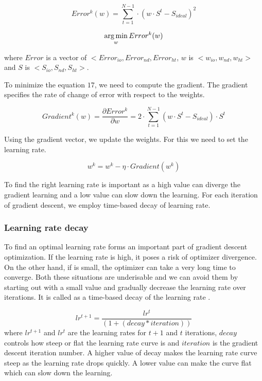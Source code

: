 \begin{equation}
Error^k(w) = \sum_{t=1}^{N-1} \cdot (w \cdot S^t - S_{ideal}) ^ 2
\end{equation}

\begin{equation}
\operatorname*{arg\,min}_w Error^k(w) 
\end{equation} 

where $Error$ is a vector of $<Error_{io}, Error_{nd}, Error_{ht}$,
$w$ is $<w_{io}, w_{nd}, w_{ht}>$ and $S$ is $<S_{io}, S_{nd}, S_{ht}>$.

To minimize the equation $17$, we need to compute the gradient. The gradient specifies the rate of change of error with respect to the weights.

\begin{equation}
Gradient^k(w) = \frac{\partial Error^k}{\partial w} = 2 \cdot \sum_{t=1}^{N-1} (w \cdot S^t - S_{ideal}) \cdot S^t
\end{equation}

Using the gradient vector, we update the weights. For this we need to set the learning rate.

\begin{equation}
w^k = w^k - \eta \cdot {Gradient(w^k)}
\end{equation}

To find the right learning rate is important as a high value can diverge the gradient learning and a low value can slow down the learning. For each iteration of gradient descent, we employ time-based decay of learning rate.


\subsubsection{Learning rate decay}
To find an optimal learning rate forms an important part of gradient descent optimization. If the learning rate is high, it poses a risk of optimizer divergence. On the other hand, if is small, the optimizer can take a very long time to converge. Both these situations are underisable and we can avoid them by starting out with a small value and gradually decrease the learning rate over iterations. It is called as a time-based decay of the learning rate \cite{articleRuderS}.

\begin{equation}
lr^{t+1} = \frac{lr^t}{( 1 + ( decay * iteration ) )}
\end{equation}
where $lr^{t+1}$ and $lr^t$ are the learning rates for $t+1$ and $t$ iterations,   $decay$ controls how steep or flat the learning rate curve is and $iteration$ is the gradient descent iteration number. A higher value of decay makes the learning rate curve steep as the learning rate drops quickly. A lower value can make the curve flat which can slow down the learning.

